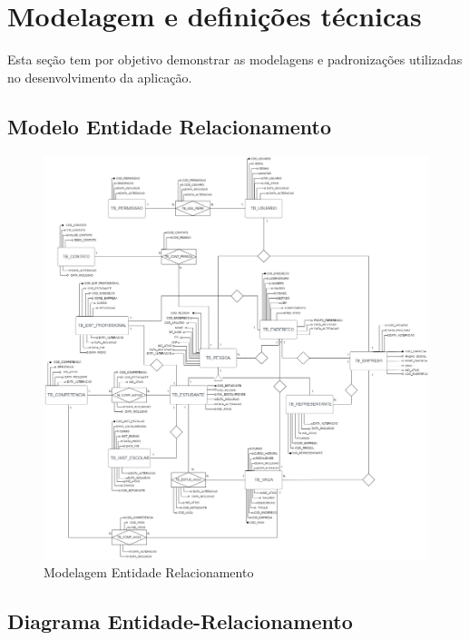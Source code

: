 \section{Modelagem e definições técnicas}
Esta seção tem por objetivo demonstrar as modelagens e padronizações utilizadas no desenvolvimento da aplicação.

\subsection{Modelo Entidade Relacionamento}

\begin{figure}[H]
	\centering 
	\caption{\label{fig:mer}Modelagem Entidade Relacionamento}
	\includegraphics[width=\textwidth]{../imagens/mer-estagiei-2.png} 
\end{figure}

\subsection{Diagrama Entidade-Relacionamento}

